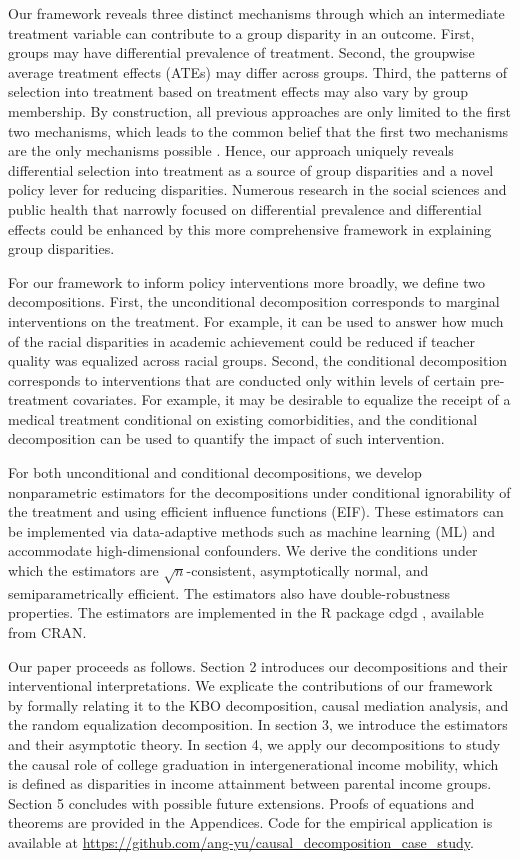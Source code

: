 \documentclass[12pt,a4paper]{article}
\begin{document}
Our framework reveals three distinct mechanisms through which an intermediate treatment variable can contribute to a group disparity in an outcome. First, groups may have differential prevalence of treatment. Second, the groupwise average treatment effects (ATEs) may differ across groups. Third, the patterns of selection into treatment based on treatment effects may also vary by group membership. By construction, all previous approaches are only limited to the first two mechanisms, which leads to the common belief that the first two mechanisms are the only mechanisms possible \citep{ward_how_2019, diderichsen_differential_2019}. Hence, our approach uniquely reveals differential selection into treatment as a source of group disparities and a novel policy lever for reducing disparities. Numerous research in the social sciences and public health that narrowly focused on differential prevalence and differential effects could be enhanced by this more comprehensive framework in explaining group disparities. 

For our framework to inform policy interventions more broadly, we define two decompositions. First, the unconditional decomposition corresponds to marginal interventions on the treatment. For example, it can be used to answer how much of the racial disparities in academic achievement could be reduced if teacher quality was equalized across racial groups. Second, the conditional decomposition corresponds to interventions that are conducted only within levels of certain pre-treatment covariates. For example, it may be desirable to equalize the receipt of a medical treatment conditional on existing comorbidities, and the conditional decomposition can be used to quantify the impact of such intervention. 

For both unconditional and conditional decompositions, we develop nonparametric estimators for the decompositions under conditional ignorability of the treatment and using efficient influence functions (EIF). These estimators can be implemented via data-adaptive methods such as machine learning (ML) and accommodate high-dimensional confounders. We  derive the conditions under which the estimators are $\sqrt{n}$-consistent, asymptotically normal, and semiparametrically efficient. The estimators also have double-robustness properties. The estimators are implemented in the R \citep{R_core_team_2023} package cdgd \citep{yu_2023}, available from CRAN.

Our paper proceeds as follows. Section 2 introduces our decompositions and their interventional interpretations. We explicate the contributions of our framework by formally relating it to the KBO decomposition, causal mediation analysis, and the random equalization decomposition. In section 3, we introduce the estimators and their asymptotic theory. In section 4, we apply our decompositions to study the causal role of college graduation in intergenerational income mobility, which is defined as disparities in income attainment between parental income groups. Section 5 concludes with possible future extensions. Proofs of equations and theorems are provided in the Appendices. Code for the empirical application is available at \url{https://github.com/ang-yu/causal_decomposition_case_study}.
\end{document}

